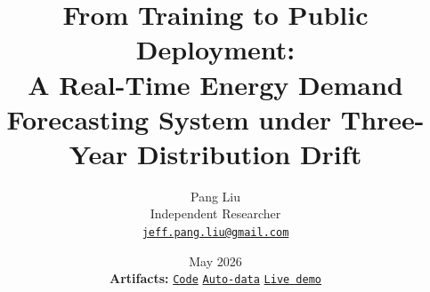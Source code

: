 \usepackage{enumitem}

\newcommand{\eg}{\textit{e.g.}}
\newcommand{\ie}{\textit{i.e.}}
\newcommand{\nz}{n_{z}}
\newcommand{\highlight}[1]{\textbf{\color{NavyAccent}#1}}
\newcommand{\zone}[1]{\texttt{#1}}

\newcommand{\PHTBD}{\textcolor{BadRed}{TBD}}
\newcommand{\PHWONEBASELINE}{17.97~\% [13.65--22.84]}
\newcommand{\PHWTWOBASELINE}{25.17~\% [18.98--32.12]}
\newcommand{\PHDIFFBASELINE}{+7.2}
\newcommand{\PHWONECHRONOS}{9.62~\% [8.31--11.07]}
\newcommand{\PHWTWOCHRONOS}{13.45~\% [10.75--16.39]}
\newcommand{\PHWONEENSEMBLE}{11.09~\% [9.04--13.64]}
\newcommand{\PHWTWOENSEMBLE}{14.51~\% [11.23--18.07]}
\newcommand{\PHWONEPERS}{12.80~\% [10.44--15.08]}
\newcommand{\PHWTWOPERS}{15.50~\% [12.64--18.68]}
\newcommand{\PHWONEPERSI}{9.97~\% [8.23--11.78]}
\newcommand{\PHWTWOPERSI}{15.34~\% [11.79--19.35]}
\newcommand{\PHWONECLIM}{13.20~\% [10.90--15.80]}
\newcommand{\PHWTWOCLIM}{15.77~\% [12.69--19.23]}
\newcommand{\PHRISEMAEONE}{24~\%}
\newcommand{\PHRISEMAEMETWO}{67~\%}
\newcommand{\PHRHO}{+0.43}
\newcommand{\PHPVAL}{0.418}
\newcommand{\PHFCSHIFTPP}{-0.43}
\newcommand{\PHFCSHIFTLO}{-0.69}
\newcommand{\PHFCSHIFTHI}{-0.19}
\newcommand{\PHFCMAXDATE}{2022-12-19}
\newcommand{\PHTABLEWONE}{}
\newcommand{\PHTABLEWTWO}{}

\newcommand{\partdivider}[1]{%
  \vspace{1.0em}%
  \noindent\colorbox{CardBG}{%
    \parbox{\linewidth}{%
      \centering\bfseries\color{NavyAccent}\large
      \rule{0pt}{1.2em}#1\rule[-0.6em]{0pt}{1.2em}%
    }%
  }%
  \vspace{0.3em}%
}

\title{\vspace{-1.5em}
  \textbf{\color{NavyAccent}
    From Training to Public Deployment:\\
    A Real-Time Energy Demand Forecasting System under Three-Year Distribution Drift
  }
}
\author{
  Pang Liu \\
  \small Independent Researcher \\
  \small \href{mailto:jeff.pang.liu@gmail.com}{\texttt{jeff.pang.liu@gmail.com}}
}
\date{
  May 2026
  \\[0.5em]
  \normalsize\textbf{\color{NavyAccent} Artifacts:}\;
  \href{https://github.com/jeffliulab/real-time-power-predict}{\texttt{Code}}
  \;\textbf{\color{NavyAccent}\textperiodcentered}\;
  \href{https://github.com/jeffliulab/new-england-real-time-power-predict-data}{\texttt{Auto-data}}
  \;\textbf{\color{NavyAccent}\textperiodcentered}\;
  \href{https://huggingface.co/spaces/jeffliulab/predict-power}{\texttt{Live demo}}
}
